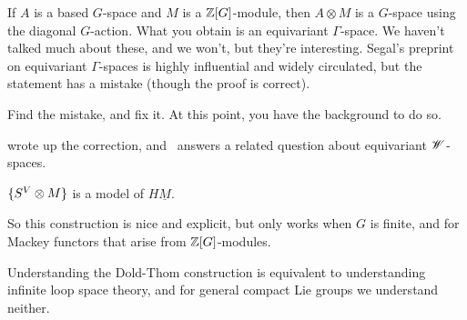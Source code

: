 \begin{cons}
If $A$ is a based $G$-space and $M$ is a $\mathbb Z[G]$-module, then $A\otimes M$ is a $G$-space using the diagonal
$G$-action. What you obtain is an equivariant $\Gamma$-space. We haven't talked much about these, and we won't, but
they're interesting. Segal's preprint on equivariant $\Gamma$-spaces \cite{SegalEquivariant} is highly influential
and widely circulated, but the statement has a mistake (though the proof is correct).
\begin{ex}
Find the mistake, and fix it. At this point, you have the background to do so.
\end{ex}
\cite{Shi89} wrote up the correction, and~\cite{BlumbergWSpace} answers a related question about equivariant
$\mathscr W$-spaces.
\begin{thm}
\label{EMmodel}
$\{S^V\otimes M\}$ is a model of $H\underline M$.
\end{thm}
So this construction is nice and explicit, but only works when $G$ is finite, and for Mackey functors that arise
from $\mathbb Z[G]$-modules.
\end{cons}
Understanding the Dold-Thom construction is equivalent to understanding infinite loop space theory, and for general
compact Lie groups we understand neither.
